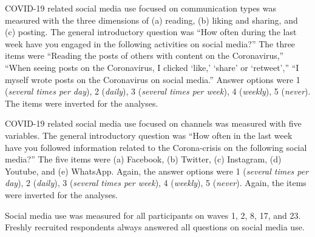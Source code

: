 \documentclass[
  english,
  man,floatsintext]{apa6}
\begin{document}
COVID-19 related social media use focused on communication types was measured with the three dimensions of (a) reading, (b) liking and sharing, and (c) posting.
The general introductory question was ``How often during the last week have you engaged in the following activities on social media?''
The three items were ``Reading the posts of others with content on the Coronavirus,'' ``When seeing posts on the Coronavirus, I clicked `like,' `share' or `retweet','' ``I myself wrote posts on the Coronavirus on social media.''
Answer options were 1 (\emph{several times per day}), 2 (\emph{daily}), 3 (\emph{several times per week}), 4 (\emph{weekly}), 5 (\emph{never}).
The items were inverted for the analyses.

COVID-19 related social media use focused on channels was measured with five variables.
The general introductory question was ``How often in the last week have you followed information related to the Corona-crisis on the following social media?''
The five items were (a) Facebook, (b) Twitter, (c) Instagram, (d) Youtube, and (e) WhatsApp.
Again, the answer options were 1 (\emph{several times per day}), 2 (\emph{daily}), 3 (\emph{several times per week}), 4 (\emph{weekly}), 5 (\emph{never}).
Again, the items were inverted for the analyses.

Social media use was measured for all participants on waves 1, 2, 8, 17, and 23.
Freshly recruited respondents always answered all questions on social media use.
\end{document}
